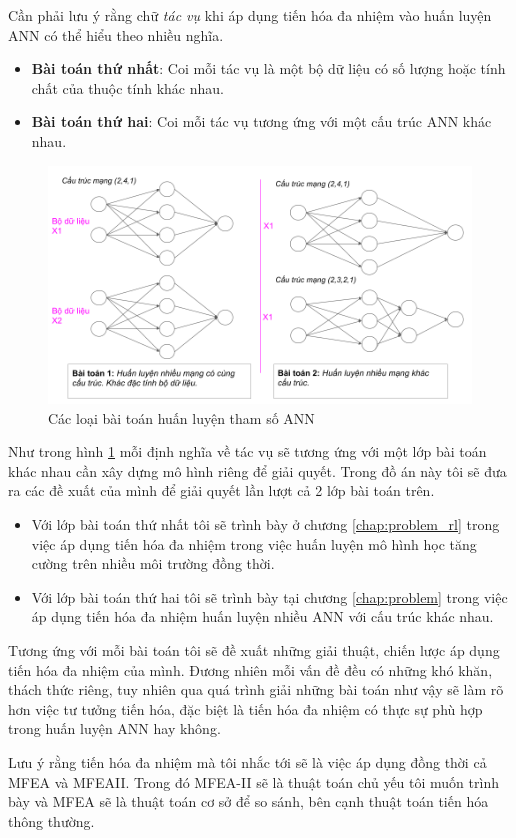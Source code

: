     Cần phải lưu ý rằng chữ \textit{tác vụ} khi áp dụng tiến hóa đa nhiệm vào huấn luyện ANN có thể hiểu theo nhiều nghĩa.
    \begin{itemize}
        \item \textbf{Bài toán thứ nhất}: Coi mỗi tác vụ là một bộ dữ liệu có số lượng hoặc tính chất của thuộc tính khác nhau.
        \item \textbf{Bài toán thứ hai}: Coi mỗi tác vụ tương ứng với một cấu trúc ANN khác nhau.
    \end{itemize}
    \begin{figure}[ht]
        \centering
        \includegraphics[width=1.0\linewidth]{images/neural-problem.png}
        \caption{Các loại bài toán huấn luyện tham số ANN}
        \label{fig:problem:neural-problem}
    \end{figure}
    Như trong hình \ref{fig:problem:neural-problem} mỗi định nghĩa về tác vụ sẽ tương ứng với một lớp bài toán khác nhau cần xây dựng mô hình riêng để giải quyết. Trong đồ án này tôi sẽ đưa ra các đề xuất của mình để giải quyết lần lượt cả 2 lớp bài toán trên.
    \begin{itemize}
        \item Với lớp bài toán thứ nhất tôi sẽ trình bày ở chương \ref{chap:problem_rl} trong việc áp dụng tiến hóa đa nhiệm trong việc huấn luyện mô hình học tăng cường trên nhiều môi trường đồng thời.
        \item Với lớp bài toán thứ hai tôi sẽ trình bày tại chương \ref{chap:problem} trong việc áp dụng tiến hóa đa nhiệm huấn luyện nhiều ANN với cấu trúc khác nhau.
    \end{itemize}
    Tương ứng với mỗi bài toán tôi sẽ đề xuất những giải thuật, chiến lược áp dụng tiến hóa đa nhiệm của mình. Đương nhiên mỗi vấn đề đều có những khó khăn, thách thức riêng, tuy nhiên qua quá trình giải những bài toán như vậy sẽ làm rõ hơn việc tư tưởng tiến hóa, đặc biệt là tiến hóa đa nhiệm có thực sự phù hợp trong huấn luyện ANN hay không.
    
    Lưu ý rằng tiến hóa đa nhiệm mà tôi nhắc tới sẽ là việc áp dụng đồng thời cả MFEA và MFEAII. Trong đó MFEA-II sẽ là thuật toán chủ yếu tôi muốn trình bày và MFEA sẽ là thuật toán cơ sở để so sánh, bên cạnh thuật toán tiến hóa thông thường.
    


